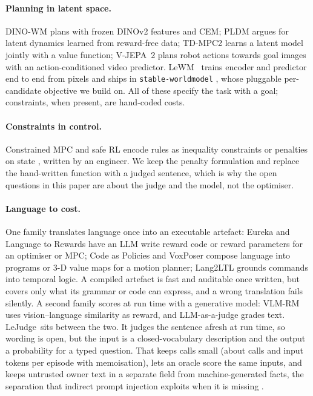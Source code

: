 \documentclass[11pt]{article}
\newcommand{\lejudge}{LeJudge}
\newcommand{\lewm}{LeWM}
\begin{document}
\paragraph{Planning in latent space.} DINO-WM \citep{zhou2024dinowm} plans with frozen DINOv2 features and CEM; PLDM \citep{sobal2025pldm} argues for latent dynamics learned from reward-free data; TD-MPC2 \citep{hansen2024tdmpc2} learns a latent model jointly with a value function; V-JEPA~2 \citep{assran2025vjepa2} plans robot actions towards goal images with an action-conditioned video predictor. \lewm\ \citep{maes2026lewm} trains encoder and predictor end to end from pixels and ships in \texttt{stable-worldmodel} \citep{swm2026}, whose pluggable per-candidate objective we build on. All of these specify the task with a goal; constraints, when present, are hand-coded costs.
\paragraph{Constraints in control.} Constrained MPC and safe RL encode rules as inequality constraints or penalties on state \citep{garcia2015safe,achiam2017cpo}, written by an engineer. We keep the penalty formulation and replace the hand-written function with a judged sentence, which is why the open questions in this paper are about the judge and the model, not the optimiser.
\paragraph{Language to cost.} One family translates language once into an executable artefact: Eureka \citep{ma2024eureka} and Language to Rewards \citep{yu2023l2r} have an LLM write reward code or reward parameters for an optimiser or MPC; Code as Policies \citep{liang2023cap} and VoxPoser \citep{huang2023voxposer} compose language into programs or 3-D value maps for a motion planner; Lang2LTL \citep{liu2023lang2ltl} grounds commands into temporal logic. A compiled artefact is fast and auditable once written, but covers only what its grammar or code can express, and a wrong translation fails silently. A second family scores at run time with a generative model: VLM-RM \citep{rocamonde2024vlmrm} uses vision--language similarity as reward, and LLM-as-a-judge \citep{zheng2023judge} grades text. \lejudge\ sits between the two. It judges the sentence afresh at run time, so wording is open, but the input is a closed-vocabulary description and the output a probability for a typed question. That keeps calls small (about  calls and  input tokens per episode with memoisation), lets an oracle score the same inputs, and keeps untrusted owner text in a separate field from machine-generated facts, the separation that indirect prompt injection exploits when it is missing \citep{greshake2023injection}.
\end{document}
